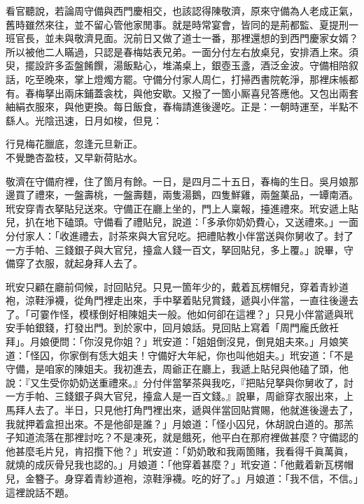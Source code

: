 看官聽說，若論周守備與西門慶相交，也該認得陳敬濟，原來守備為人老成正氣，舊時雖然來往，並不留心管他家閒事。就是時常宴會，皆同的是荊都監、夏提刑一班官長，並未與敬濟見面。況前日又做了道士一番，那裡還想的到西門慶家女婿？所以被他二人瞞過，只認是春梅姑表兄弟。一面分付左右放桌兒，安排酒上來。須臾，擺設許多盃盤餚饌，湯飯點心，堆滿桌上，銀壺玉盞，酒泛金波。守備相陪叙話，吃至晚來，掌上燈燭方罷。守備分付家人周仁，打掃西書院乾淨，那裡床帳都有。春梅拏出兩床鋪蓋衾枕，與他安歇。又撥了一箇小厮喜兒答應他。又包出兩套紬絹衣服來，與他更換。每日飯食，春梅請進後邊吃。正是：一朝時運至，半點不繇人。光陰迅速，日月如梭，但見：

\begin{myquote}
行見梅花臘底，忽逢元旦新正。\\不覺艷杏盈枝，又早新荷貼水。
\end{myquote}

敬濟在守備府裡，住了箇月有餘。一日，是四月二十五日，春梅的生日。吳月娘那邊買了禮來，一盤壽桃，一盤壽麵，兩隻湯鵝，四隻鮮雞，兩盤菓品，一罈南酒。玳安穿青衣拏貼兒送來。守備正在廳上坐的，門上人稟報，擡進禮來。玳安遞上貼兒，扒在地下磕頭。守備看了禮貼兒，說道：「多承你奶奶費心，又送禮來。」一面分付家人：「收進禮去，討茶來與大官兒吃。把禮貼教小伴當送與你舅收了。封了一方手帕、三錢銀子與大官兒，擡盒人錢一百文，拏回貼兒，多上覆。」說畢，守備穿了衣服，就起身拜人去了。

玳安只顧在廳前伺候，討回貼兒。只見一箇年少的，戴着瓦楞帽兒，穿着青紗道袍，涼鞋淨襪，從角門裡走出來，手中拏着貼兒賞錢，遞與小伴當，一直往後邊去了。「可霎作怪，模樣倒好相陳姐夫一般。他如何卻在這裡？」只見小伴當遞與玳安手帕銀錢，打發出門。到於家中，回月娘話。見回貼上寫着「周門龐氏斂衽拜」。月娘便問：「你沒見你姐？」玳安道：「姐姐倒沒見，倒見姐夫來。」月娘笑道：「怪囚，你家倒有恁大姐夫！守備好大年紀，你也叫他姐夫。」玳安道：「不是守備，是咱家的陳姐夫。我初進去，周爺正在廳上，我遞上貼兒與他磕了頭，他說：『又生受你奶奶送重禮來。』分付伴當拏茶與我吃，『把貼兒拏與你舅收了，討一方手帕、三錢銀子與大官兒，擡盒人是一百文錢。』說畢，周爺穿衣服出來，上馬拜人去了。半日，只見他打角門裡出來，遞與伴當回貼賞賜，他就進後邊去了，我就押着盒担出來。不是他卻是誰？」月娘道：「怪小囚兒，休胡說白道的。那羔子知道流落在那裡討吃？不是凍死，就是餓死，他平白在那府裡做甚麼？守備認的他甚麼毛片兒，肯招攬下他？」玳安道：「奶奶敢和我兩箇賭，我看得千眞萬眞，就燒的成灰骨兒我也認的。」月娘道：「他穿着甚麼？」玳安道：「他戴着新瓦楞帽兒，金簪子。身穿着青紗道袍，涼鞋淨襪。吃的好了。」月娘道：「我不信，不信。」{}這裡說話不題。

